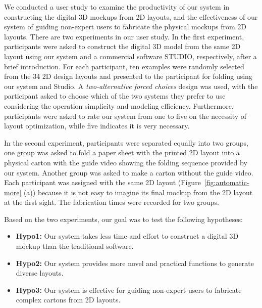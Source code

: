  
We conducted a user study to examine the productivity of our system in constructing the digital 3D mockups from 2D layouts, and the effectiveness of our system of guiding non-expert users to fabricate the physical mockups from 2D layouts. 
%
There are two experiments in our user study.
% 
In the first experiment, participants were asked to construct the digital 3D model from the same 2D layout using our system and a commercial software STUDIO, respectively, after a brief introduction.
For each participant, ten examples were randomly selected from the 34 2D design layouts and presented to the participant for folding using our system and Studio.
A \emph{two-alternative forced choices} design was used, with the participant asked to choose which of the two systems they prefer to use considering the operation simplicity and modeling efficiency. 
%
Furthermore, participants were asked to rate our system from one to five on the necessity of layout optimization, while five indicates it is very necessary.


%
In the second experiment, participants were separated equally into two groups, one group was asked to fold a paper sheet with the printed 2D layout into a physical carton with the guide video showing the folding sequence provided by our system. Another group was asked to make a carton without the guide video. 
Each participant was assigned with the same 2D layout (Figure~\ref{fig:automatic-more} (a)) because it is not easy to imagine its final mockup from the 2D layout at the first sight.
%
The fabrication times were recorded for two groups.
%

Based on the two experiments, our goal was to test the following hypotheses:

\begin{itemize}
	\item \textbf{Hypo1:} Our system takes less time and effort to construct a digital 3D mockup than the traditional software.
	\item \textbf{Hypo2:} Our system provides more novel and practical functions to generate diverse layouts.
	\item \textbf{Hypo3:} Our system is effective for guiding non-expert users to fabricate complex cartons from 2D layouts.
\end{itemize}

